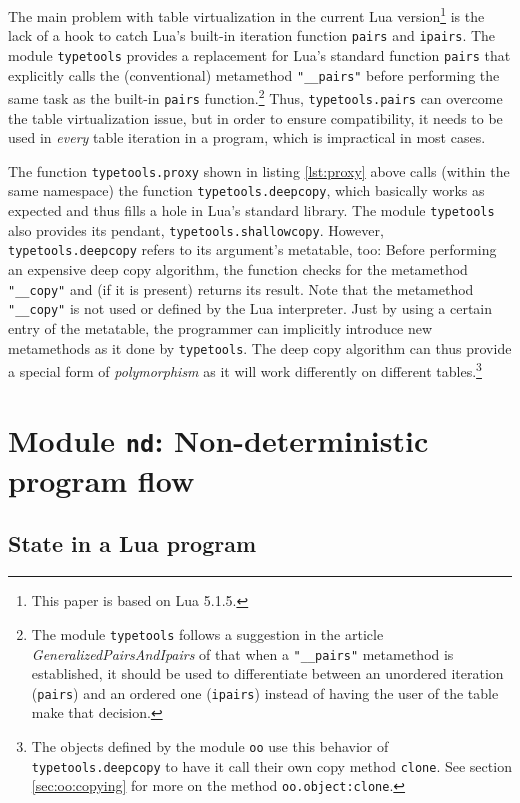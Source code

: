 The main problem with table virtualization in the current Lua version\footnote{This paper is based on Lua 5.1.5.} is the lack of a hook to catch Lua's built-in iteration function \texttt{pairs} and \texttt{ipairs}. The module \texttt{typetools} provides a replacement for Lua's standard function \texttt{pairs} that explicitly calls the (conventional) metamethod \texttt{"\_\_pairs"} before performing the same task as the built-in \texttt{pairs} function.\footnote{The module \texttt{typetools} follows a suggestion in the article \emph{GeneralizedPairsAndIpairs} of \cite{LuaUsersWiki} that when a \texttt{"\_\_pairs"} metamethod is established, it should be used to differentiate between an unordered iteration (\texttt{pairs}) and an ordered one (\texttt{ipairs}) instead of having the user of the table make that decision.} Thus, \texttt{typetools.pairs} can overcome the table virtualization issue, but in order to ensure compatibility, it needs to be used in \emph{every} table iteration in a program, which is impractical in most cases.

The function \texttt{typetools.proxy} shown in listing \ref{lst:proxy} above calls (within the same namespace) the function \texttt{typetools.deepcopy}, which basically works as expected and thus fills a hole in Lua's standard library. The module \texttt{typetools} also provides its pendant, \texttt{typetools.shallowcopy}. However, \texttt{typetools.deepcopy} refers to its argument's metatable, too: Before performing an expensive deep copy algorithm, the function checks for the metamethod \texttt{"\_\_copy"} and (if it is present) returns its result. Note that the metamethod \texttt{"\_\_copy"} is not used or defined by the Lua interpreter. Just by using a certain entry of the metatable, the programmer can implicitly introduce new metamethods as it done by \texttt{typetools}. The deep copy algorithm can thus provide a special form of \emph{polymorphism} as it will work differently on different tables.\footnote{The objects defined by the module \texttt{oo} use this behavior of \texttt{typetools.deepcopy} to have it call their own copy method \texttt{clone}. See section \ref{sec:oo:copying} for more on the method \texttt{oo.object:clone}.}


\section{Module \texttt{nd}: Non-deterministic program flow}
\label{sec:tools:nd}

\subsection{State in a Lua program}

